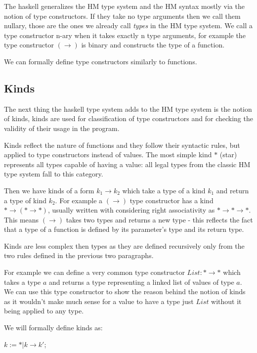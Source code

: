 The haskell generalizes the HM type system and the HM syntax mostly via the notion of type constructors. If they take no type arguments then we call them nullary, those are the ones we already call \emph{types} in the HM type system. We call a type constructor n-ary when it takes exactly n type arguments, for example the type constructor $(\rightarrow)$ is binary and constructs the type of a function. %

We can formally define type constructors similarly to functions.

\subsection{Kinds}

The next thing the haskell type system adds to the HM type system is the notion of kinds, kinds are used for classification of type constructors and for checking the validity of their usage in the program.

Kinds reflect the nature of functions and they follow their syntactic rules, but applied to type constructors instead of values. The most simple kind $*$ (star) represents all types capable of having a value: all legal types from the classic HM type system fall to this category.

Then we have kinds of a form $k_1 \rightarrow k_2$ which take a type of a kind $k_1$ and return a type of kind $k_2$. For example a $(\rightarrow)$ type constructor has a kind $* \rightarrow (* \rightarrow *)$, usually written with considering right associativity as $* \rightarrow * \rightarrow *$. This means $(\rightarrow)$ takes two types and returns a new type - this reflects the fact that a type of a function is defined by its parameter's type and its return type.

Kinds are less complex then types as they are defined recursively only from the two rules defined in the previous two paragraphs.

For example we can define a very common type constructor $List: * \rightarrow *$ which takes a type $a$ and returns a type representing a linked list of values of type $a$. We can use this type constructor to show the reason behind the notion of kinds as it wouldn't make much sense for a value to have a type just $List$ without it being applied to any type. %

We will formally define kinds as:

$k := * | k \rightarrow k'$;

